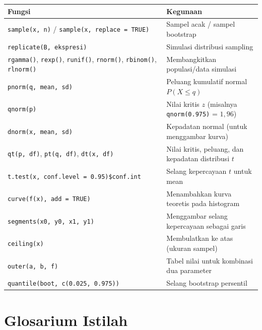 \documentclass[
  indonesian,
  letterpaper,
]{book}
\newcounter{none} %
\begin{document}
{\def\LTcaptype{none} %
\begin{longtable}[]{@{}
  >{\raggedright\arraybackslash}p{}
  >{\raggedright\arraybackslash}p{}@{}}
\toprule\noalign{}
\begin{minipage}[b]{\linewidth}\raggedright
Fungsi
\end{minipage} & \begin{minipage}[b]{\linewidth}\raggedright
Kegunaan
\end{minipage} \\
\midrule\noalign{}
\endhead
\bottomrule\noalign{}
\endlastfoot
\texttt{sample(x,\ n)} / \texttt{sample(x,\ replace\ =\ TRUE)} & Sampel
acak / sampel bootstrap \\
\texttt{replicate(B,\ ekspresi)} & Simulasi distribusi sampling \\
\texttt{rgamma()}, \texttt{rexp()}, \texttt{runif()}, \texttt{rnorm()},
\texttt{rbinom()}, \texttt{rlnorm()} & Membangkitkan populasi/data
simulasi \\
\texttt{pnorm(q,\ mean,\ sd)} & Peluang kumulatif normal
\(P(X \le q)\) \\
\texttt{qnorm(p)} & Nilai kritis \(z\) (misalnya \texttt{qnorm(0.975)} =
\(1{,}96\)) \\
\texttt{dnorm(x,\ mean,\ sd)} & Kepadatan normal (untuk menggambar
kurva) \\
\texttt{qt(p,\ df)}, \texttt{pt(q,\ df)}, \texttt{dt(x,\ df)} & Nilai
kritis, peluang, dan kepadatan distribusi \(t\) \\
\texttt{t.test(x,\ conf.level\ =\ 0.95)\$conf.int} & Selang kepercayaan
\(t\) untuk mean \\
\texttt{curve(f(x),\ add\ =\ TRUE)} & Menambahkan kurva teoretis pada
histogram \\
\texttt{segments(x0,\ y0,\ x1,\ y1)} & Menggambar selang kepercayaan
sebagai garis \\
\texttt{ceiling(x)} & Membulatkan ke atas (ukuran sampel) \\
\texttt{outer(a,\ b,\ f)} & Tabel nilai untuk kombinasi dua parameter \\
\texttt{quantile(boot,\ c(0.025,\ 0.975))} & Selang bootstrap
persentil \\
\end{longtable}
}

\section{Glosarium Istilah}\label{glosarium-istilah-5}
\end{document}
